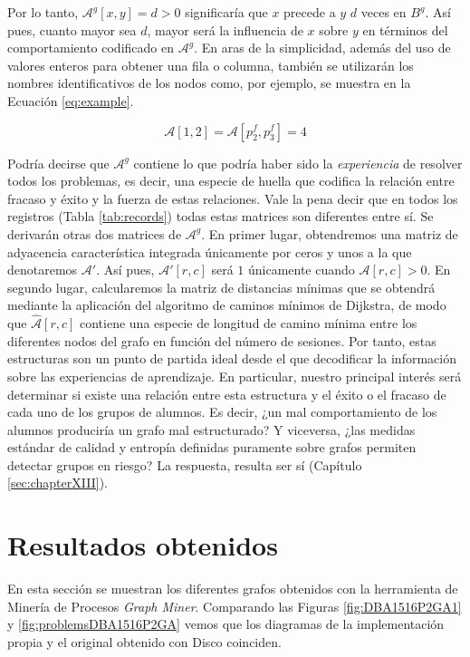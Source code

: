 Por lo tanto, $\mathcal{A}^g[x,y] = d > 0$ significaría que $x$ precede a $y$ $d$ veces en $B^g$. Así pues, cuanto mayor sea $d$, mayor será la influencia de $x$ sobre $y$ en términos del comportamiento codificado en $\mathcal{A}^g$. En aras de la simplicidad, además del uso de valores enteros para obtener una fila o columna, también se utilizarán los nombres identificativos de los nodos como, por ejemplo, se muestra en la Ecuación \ref{eq:example}.

\begin{equation}\label{eq:example}
\mathcal{A}[1,2] = \mathcal{A}[p_2^f,p_3^f] = 4
\end{equation}

Podría decirse que $\mathcal{A}^g$ contiene lo que podría haber sido la \emph{experiencia} de resolver todos los problemas, es decir, una especie de huella que codifica la relación entre fracaso y éxito y la fuerza de estas relaciones. Vale la pena decir que en todos los registros (Tabla \ref{tab:records}) todas estas matrices son diferentes entre sí. Se derivarán otras dos matrices de $\mathcal{A}^g$. En primer lugar, obtendremos una matriz de adyacencia característica integrada únicamente por ceros y unos a la que denotaremos $\mathcal{A}'$. Así pues, $\mathcal{A}'[r, c]$ será $1$ únicamente cuando $\mathcal{A}[r, c] > 0$. En segundo lugar, calcularemos la matriz de distancias mínimas que se obtendrá mediante la aplicación del algoritmo de caminos mínimos de Dijkstra, de modo que $\hat{\mathcal{A}}[r, c]$ contiene una especie de longitud de camino mínima entre los diferentes nodos del grafo en función del número de sesiones. Por tanto, estas estructuras son un punto de partida ideal desde el que decodificar la información sobre las experiencias de aprendizaje. En particular, nuestro principal interés será determinar si existe una relación entre esta estructura y el éxito o el fracaso de cada uno de los grupos de alumnos. Es decir, ¿un mal comportamiento de los alumnos produciría un grafo mal estructurado? Y viceversa, ¿las medidas estándar de calidad y entropía definidas puramente sobre grafos permiten detectar grupos en riesgo? La respuesta, resulta ser sí (Capítulo \ref{sec:chapterXIII}).

\section{Resultados obtenidos}

En esta sección se muestran los diferentes grafos obtenidos con la herramienta de Minería de Procesos \emph{Graph Miner}. Comparando las Figuras \ref{fig:DBA1516P2GA1} y \ref{fig:problemsDBA1516P2GA} vemos que los diagramas de la implementación propia y el original obtenido con Disco coinciden.

